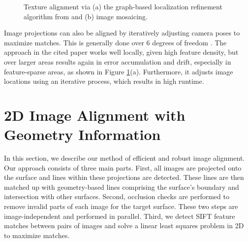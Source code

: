 \documentclass[]{spie}  %
\begin{document}
\begin{figure}
  \centering

  \caption{Texture alignment via (a) the graph-based localization
    refinement algorithm from \cite{chen2010indoor} and (b) image
    mosaicing.}
  \label{fig:mosaic3D}
\end{figure}

Image projections can also be aligned by iteratively adjusting camera
poses to maximize matches. This is generally done over 6 degrees of
freedom \cite{liu2010indoor}. The approach in the cited paper works
well locally, given high feature density, but over larger areas
results again in error accumulation and drift, especially in
feature-sparse areas, as shown in Figure
\ref{fig:mosaic3D}(a). Furthermore, it adjusts image locations using
an iterative process, which results in high runtime.


\section{2D Image Alignment with Geometry Information}
\label{sec:2dAlignment}
In this section, we describe our method of efficient and robust image
alignment. Our approach consists of three main parts. First, all
images are projected onto the surface and lines within these
projections are detected. These lines are then matched up with
geometry-based lines comprising the surface's boundary and
intersection with other surfaces. Second, occlusion checks are
performed to remove invalid parts of each image for the target
surface. These two steps are image-independent and performed in
parallel. Third, we detect SIFT feature matches between pairs of
images and solve a linear least squares problem in 2D to maximize
matches.
\end{document}

